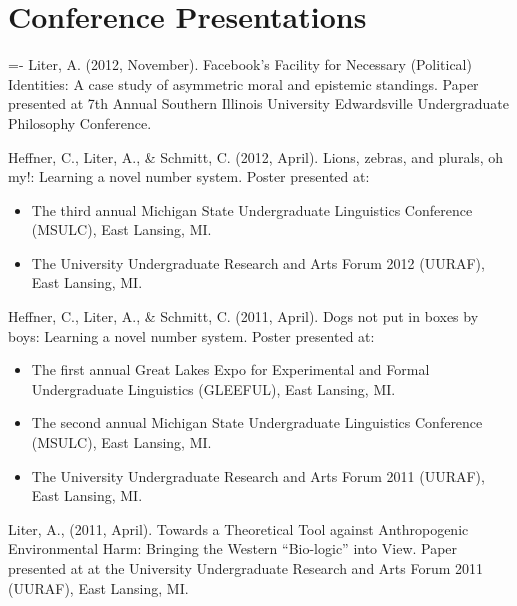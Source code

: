 \documentclass[11pt,a4paper,sans]{moderncv}   %
\begin{document}
\section{Conference Presentations}
\newenvironment{fakebib}
{\par\leftskip=0.25in \parindent=-\leftskip}
{\par}
\begin{fakebib}
Liter, A. (2012, November). Facebook's Facility for Necessary (Political) Identities: A case study of asymmetric moral and epistemic standings. Paper presented at  7th Annual Southern Illinois University Edwardsville Undergraduate Philosophy Conference. 

Heffner, C., Liter, A., \& Schmitt, C. (2012, April). Lions, zebras, and plurals, oh my!: Learning a novel number system. Poster presented at:
\begin{itemize}[leftmargin=.25in]
\item The third annual Michigan State Undergraduate Linguistics Conference (MSULC), East Lansing, MI.
\item The University Undergraduate Research and Arts Forum 2012 (UURAF), East Lansing, MI.
\end{itemize}

Heffner, C., Liter, A., \& Schmitt, C. (2011, April). Dogs not put in boxes by boys: Learning a novel number system. Poster presented at:
\begin{itemize}[leftmargin=.25in]
\item The first annual Great Lakes Expo for Experimental and Formal Undergraduate Linguistics (GLEEFUL), East
Lansing, MI.
\item The second annual Michigan State Undergraduate Linguistics Conference (MSULC), East Lansing, MI.
\item The University Undergraduate Research and Arts Forum 2011 (UURAF), East Lansing, MI.
\end{itemize}

Liter, A., (2011, April). Towards a Theoretical Tool against Anthropogenic Environmental Harm: Bringing the Western ``Bio-logic'' into View. Paper presented at at the University Undergraduate Research and Arts Forum 2011 (UURAF), East Lansing, MI. %

\end{fakebib}
\end{document}
